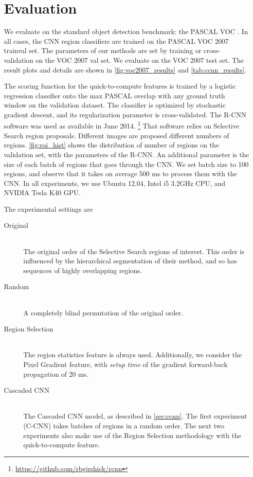 \section{Evaluation}\label{sec:ccnn_evaluation}

We evaluate on the standard object detection benchmark: the PASCAL VOC \cite{pascal-voc-2010}.
In all cases, the CNN region classifiers are trained on the PASCAL VOC 2007 trainval set.
The parameters of our methods are set by training or cross-validation on the VOC 2007 val set.
We evaluate on the VOC 2007 test set.
The result plots and details are shown in \autoref{fig:voc2007_results} and \autoref{tab:ccnn_results}.

The scoring function for the quick-to-compute features is trained by a logistic regression classifier onto the max PASCAL overlap with any ground truth window on the validation dataset.
The classifier is optimized by stochastic gradient descent, and its regularization parameter is cross-validated.
The R-CNN software was used as available in June 2014.
\footnote{\url{https://github.com/rbgirshick/rcnn}}
That software relies on Selective Search \cite{Uijlings-IJCV-2013} region proposals.
Different images are proposed different numbers of regions.
\autoref{fig:roi_hist} shows the distribution of number of regions on the validation set, with the parameters of the R-CNN.
An additional parameter is the size of each batch of regions that goes through the CNN.
We set batch size to 100 regions, and observe that it takes on average 500 ms to process them with the CNN.
In all experiments, we use Ubuntu 12.04, Intel i5 3.2GHz CPU, and NVIDIA Tesla K40 GPU.





The experimental settings are
\begin{description}
  \item[Original] \hfill \\
  The original order of the Selective Search regions of interest.
  This order is influenced by the hierarchical segmentation of their method, and so has sequences of highly overlapping regions.

  \item[Random] \hfill \\
  A completely blind permutation of the original order.

  \item[Region Selection] \hfill \\
  The region statistics feature is always used.
  Additionally, we consider the Pixel Gradient feature, with \emph{setup time} of the gradient forward-back propagation of 20 ms.

  \item[Cascaded CNN] \hfill \\
  The Cascaded CNN model, as described in \autoref{sec:ccnn}.
  The first experiment (C-CNN) takes batches of regions in a random order.
  The next two experiments also make use of the Region Selection methodology with the quick-to-compute feature.
\end{description}

